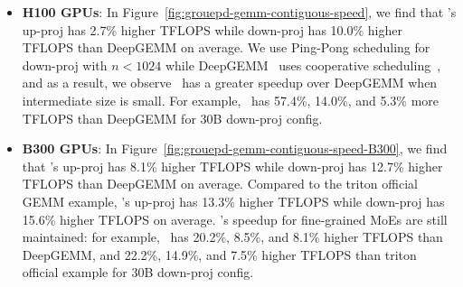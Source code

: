 \begin{itemize}
    \item \textbf{H100 GPUs}: In Figure~\ref{fig:grouepd-gemm-contiguous-speed}, we find that \Algname's up-proj has 2.7\% higher TFLOPS while down-proj has 10.0\% higher TFLOPS than DeepGEMM on average. We use Ping-Pong scheduling for down-proj with $n<1024$ while DeepGEMM~\citep{deepgemm} uses cooperative scheduling~\citep{deepgemm,pingpongandcooperative}, and as a result, we observe \Algname~has a greater speedup over DeepGEMM when intermediate size is small. For example, \Algname~has 57.4\%, 14.0\%, and 5.3\% more TFLOPS than DeepGEMM for 30B down-proj config. 
    
    \item \textbf{B300 GPUs}: In Figure~\ref{fig:grouepd-gemm-contiguous-speed-B300}, we find that \Algname's up-proj has 8.1\% higher TFLOPS while down-proj has 12.7\% higher TFLOPS than DeepGEMM on average. Compared to the triton official GEMM example, \Algname's up-proj has 13.3\% higher TFLOPS while down-proj has 15.6\% higher TFLOPS on average. \Algname's speedup for fine-grained MoEs are still maintained: for example, \Algname~has 20.2\%, 8.5\%, and 8.1\% higher TFLOPS than DeepGEMM, and 22.2\%, 14.9\%, and 7.5\% higher TFLOPS than triton official example for 30B down-proj config. 
\end{itemize}


